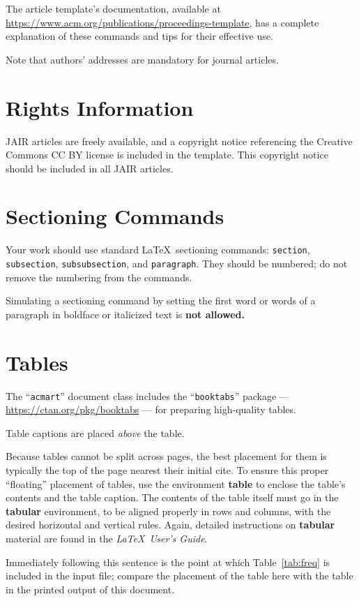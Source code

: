 \documentclass[review]{jair}
\begin{document}
The article template's documentation, available at
\url{https://www.acm.org/publications/proceedings-template}, has a
complete explanation of these commands and tips for their effective
use.

Note that authors' addresses are mandatory for journal articles.

\section{Rights Information}

JAIR articles are freely available, and a copyright notice referencing the Creative Commons CC BY license is included in the template. This copyright notice should be included in all JAIR articles.

\section{Sectioning Commands}

Your work should use standard \LaTeX\ sectioning commands:
\verb|section|, \verb|subsection|, \verb|subsubsection|, and
\verb|paragraph|. They should be numbered; do not remove the numbering
from the commands.

Simulating a sectioning command by setting the first word or words of
a paragraph in boldface or italicized text is {\bfseries not allowed.}

\section{Tables}

The ``\verb|acmart|'' document class includes the ``\verb|booktabs|''
package --- \url{https://ctan.org/pkg/booktabs} --- for preparing
high-quality tables.

Table captions are placed {\itshape above} the table.

Because tables cannot be split across pages, the best placement for
them is typically the top of the page nearest their initial cite.  To
ensure this proper ``floating'' placement of tables, use the
environment \textbf{table} to enclose the table's contents and the
table caption.  The contents of the table itself must go in the
\textbf{tabular} environment, to be aligned properly in rows and
columns, with the desired horizontal and vertical rules.  Again,
detailed instructions on \textbf{tabular} material are found in the
\textit{\LaTeX\ User's Guide}.

Immediately following this sentence is the point at which
Table~\ref{tab:freq} is included in the input file; compare the
placement of the table here with the table in the printed output of
this document.
\end{document}
